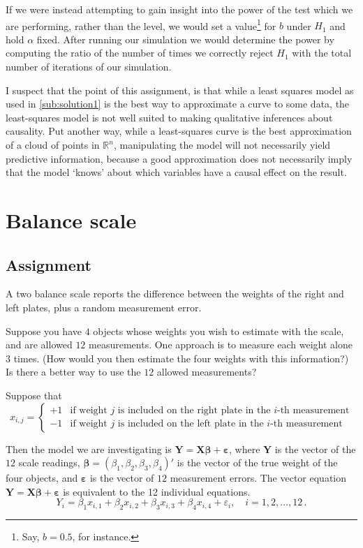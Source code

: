 \documentclass{amsart}
\newcommand{\ep}{\varepsilon}
\newcommand{\bvec}[1]{{\boldsymbol #1}}
\begin{document}
			If we were instead attempting to gain insight into the power of the test which we are performing, rather than the level, we would set a value\footnote{Say, $b = 0.5$, for instance.} for $b$ under $H_{1}$ and hold $\alpha$ fixed.
			After running our simulation we would determine the power by computing the ratio of the number of times we correctly reject $H_{1}$ with the total number of iterations of our simulation.

			I suspect that the point of this assignment, is that while a least squares model as used in \ref{sub:solution1} is the best way to approximate a curve to some data, the least-squares model is not well suited to making qualitative inferences about causality. Put another way, while a least-squares curve is the best approximation of a cloud of points in $\mathbb{R}^{n}$, manipulating the model will not necessarily yield predictive information, because a good approximation does not necessarily imply that the model `knows' about which variables have a causal effect on the result.

	\section{Balance scale} %
	\label{sec:balance_scale}
		\subsection{Assignment} %
		\label{sub:assignment3}
			A two balance scale reports the difference between the weights of the right and left plates, plus a random measurement error.

			Suppose you have $4$ objects whose weights you wish to estimate with the scale, and are allowed $12$ measurements.  
			One approach is to measure each weight alone $3$ times.
			(How would you then estimate the four weights with this information?)
			Is there a better way to use the $12$ allowed measurements?

			Suppose that $$ x_{i,j} = \begin{cases}
			+ 1 & \text{if weight $j$ is included on the right plate in the $i$-th measurement} \\
			- 1 & \text{if weight $j$ is included on the left plate in the $i$-th measurement}
			\end{cases}$$

			Then the model we are investigating is $\bvec{Y} = \bvec{X} \bvec{\beta} + \bvec{\ep}$, where $\bvec{Y}$ is the vector of the $12$ scale readings,	$\bvec{\beta} = (\beta_1,\beta_2,\beta_3,\beta_4)'$ is the vector of the true weight of the four objects, and $\bvec{\ep}$ is the vector of $12$ measurement errors. 
			The vector equation $\bvec{Y} = \bvec{X} \bvec{\beta} + \bvec{\ep}$ is equivalent to the 12 individual equations. 
			$$Y_{i} = \beta_{1} x_{i,1} + \beta_{2} x_{i,2} + \beta_{3} x_{i,3} + \beta_{4} x_{i,4}	+ \ep_{i}, \quad i=1,2,\ldots,12 \,.$$
\end{document}
